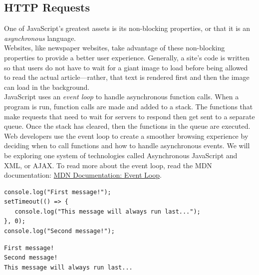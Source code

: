 \documentclass[11pt]{article}
\begin{document}
\subsection{HTTP Requests}
One of JavaScript’s greatest assets is its non-blocking properties, or that it is an \textit{asynchronous} language. \\
\newline
Websites, like newspaper websites, take advantage of these non-blocking properties to provide a better user experience. Generally, a site’s code is written so that users do not have to wait for a giant image to load before being allowed to read the actual article—rather, that text is rendered first and then the image can load in the background. \\
\newline
JavaScript uses an \textit{event loop} to handle asynchronous function calls. When a program is run, function calls are made and added to a stack. The functions that make requests that need to wait for servers to respond then get sent to a separate queue. Once the stack has cleared, then the functions in the queue are executed. \\
\newline
Web developers use the event loop to create a smoother browsing experience by deciding when to call functions and how to handle asynchronous events. We will be exploring one system of technologies called Asynchronous JavaScript and XML, or AJAX. To read more about the event loop, read the MDN documentation: \href{https://developer.mozilla.org/en-US/docs/Web/JavaScript/EventLoop}{MDN Documentation: Event Loop}. 
\begin{lstlisting}
console.log("First message!");
setTimeout(() => {
   console.log("This message will always run last...");
}, 0);
console.log("Second message!");
\end{lstlisting}
\begin{lstlisting}[basicstyle=\small\ttfamily\color{theWhite}, backgroundcolor = \color{theBlack}, language = Comment]
First message!
Second message!
This message will always run last...
\end{lstlisting}
\end{document}
